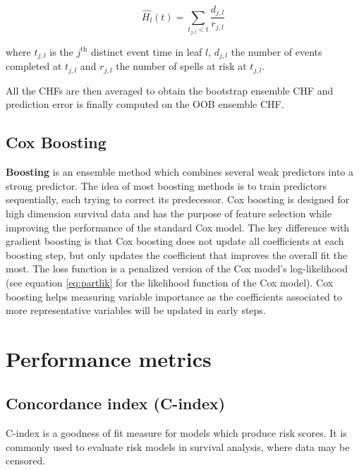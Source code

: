 \documentclass[
]{book}
\begin{document}
\begin{equation}
  \widehat{H_l}(t) = \sum_{t_{j, l} < t} \frac{d_{j,l}}{r_{j,l}}
  \label{eq:chf}
\end{equation}

where \(t_{j,l}\) is the \(j^{\text{th}}\) distinct event time in leaf \(l\), \(d_{j,l}\) the number of events completed at \(t_{j,l}\) and \(r_{j,l}\) the number of spells at risk at \(t_{j,l}\).

All the CHFs are then averaged to obtain the bootstrap ensemble CHF and prediction error is finally computed on the OOB ensemble CHF.

\hypertarget{cox-boosting}{%
\subsection{Cox Boosting}\label{cox-boosting}}

\textbf{Boosting} is an ensemble method which combines several weak predictors into a strong predictor. The idea of most boosting methods is to train predictors sequentially, each trying to correct its predecessor. Cox boosting \citep{COX_BOOSTING} is designed for high dimension survival data and has the purpose of feature selection while improving the performance of the standard Cox model. The key difference with gradient boosting is that Cox boosting does not update all coefficients at each boosting step, but only updates the coefficient that improves the overall fit the most. The loss function is a penalized version of the Cox model's log-likelihood (see equation \eqref{eq:partlik} for the likelihood function of the Cox model). Cox boosting helps measuring variable importance as the coefficients associated to more representative variables will be updated in early steps.

\hypertarget{metrics}{%
\section{Performance metrics}\label{metrics}}

\hypertarget{concordance-index-c-index}{%
\subsection{Concordance index (C-index)}\label{concordance-index-c-index}}

C-index is a goodness of fit measure for models which produce risk scores. It is commonly used to evaluate risk models in survival analysis, where data may be censored.
\end{document}
